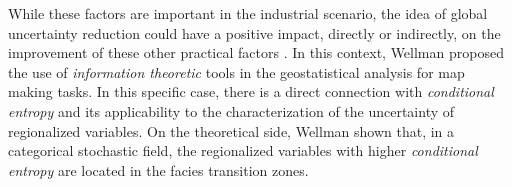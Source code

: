 While these factors are important in the industrial scenario, the idea of global uncertainty reduction could have a positive impact, directly or indirectly, on the improvement of these other practical factors \cite{krause06near22}. In this context, Wellman \cite{wellmann2013information} proposed the use of \emph{information theoretic} tools in the geostatistical analysis for map making tasks. In this specific case, there is a direct connection with \emph{conditional entropy} and its applicability to the characterization of the uncertainty of regionalized variables. On the theoretical side, Wellman \cite{wellmann2013information} shown that, in a categorical stochastic field, the regionalized variables with higher \emph{conditional entropy} are located in the facies transition zones.















































































